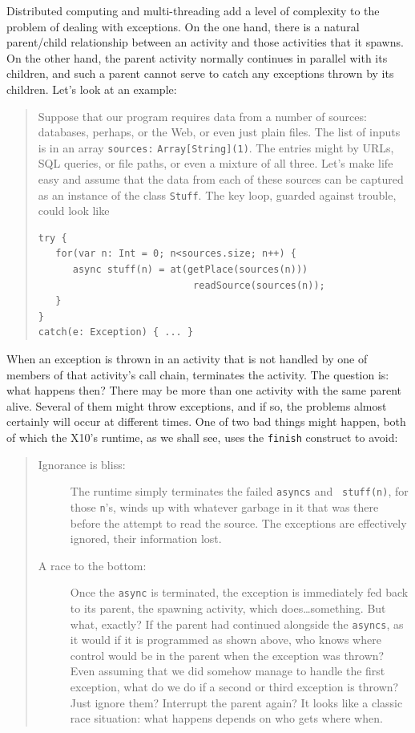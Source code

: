 Distributed computing and multi-threading add a level of complexity to the
problem of dealing with exceptions.  On the one hand, there is a natural
parent/child relationship between an activity and those activities that it
spawns. On the other hand, the parent activity normally continues in parallel
with its children, and such a parent cannot serve to catch any exceptions
thrown by its children.  Let's look at an example:
\begin{quote}
Suppose that our program requires data from a number of sources: data\-bases,
perhaps, or the Web, or even just plain files.  
The list of inputs is in an array {\tt sources:} {\tt Array[String](1)}.
The entries might by URLs, SQL queries, or file paths, or
even a mixture of all three.  Let's make life easy and assume that the data from
each of these sources can be captured as an instance of the class {\tt Stuff}.
The key loop, guarded against trouble, could look like
\begin{verbatim}
try {
   for(var n: Int = 0; n<sources.size; n++) {
      async stuff(n) = at(getPlace(sources(n))) 
                           readSource(sources(n));
   }
}
catch(e: Exception) { ... }
\end{verbatim}
\end{quote}
When an exception is thrown in an activity that is not handled by one of
members of that activity's call chain, \Xten{} terminates the activity.  The
question is: what happens then?  There may be more than one activity with the
same parent alive.  Several of them might throw exceptions, and if so, the
problems almost certainly will occur at different times.  One of two bad
things might happen, both of which the X10's runtime, as we shall see, uses the
{\tt finish} construct to avoid:
\begin{quote}
\begin{description}
\item[Ignorance is bliss:]
The runtime simply terminates the failed {\tt asyncs} and {\tt
stuff(n)}, for those {\tt n}'s, winds up with whatever garbage in it that was
there before the attempt to read the source.  The exceptions are effectively
ignored, their information lost.

\item[A race to the bottom:]
Once the {\tt async} is terminated, the exception is immediately fed back to its
parent, the spawning activity, which does\ldots some\-thing.  But what, exactly?
If the parent had continued alongside the {\tt asyncs}, as it would if it is
programmed as shown above, who knows where control would be in the parent when
the exception was thrown? Even assuming that we did somehow manage to handle
the first exception, what do we do if a second or third exception is thrown? 
Just ignore them?  Interrupt the parent again? It looks like a classic race
situation: what happens depends on who gets where when.
\end{description}
\end{quote}
